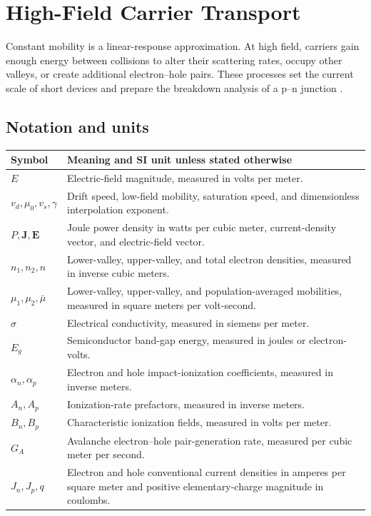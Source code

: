 \chapter{High-Field Carrier Transport}
\label{ch:high-field-transport}

Constant mobility is a linear-response approximation.  At high field, carriers
gain enough energy between collisions to alter their scattering rates, occupy
other valleys, or create additional electron--hole pairs.  These processes set
the current scale of short devices and prepare the breakdown analysis of a
p--n junction \cite[Chap.~2]{szeLee2012}.

\section{Notation and units}

\begin{center}
\small
\begin{tabularx}{\textwidth}{@{}lX@{}}
\toprule
Symbol & Meaning and SI unit unless stated otherwise \\
\midrule
$E$ & Electric-field magnitude, measured in volts per meter. \\
$v_d,\mu_0,v_s,\gamma$ & Drift speed, low-field mobility, saturation speed, and dimensionless interpolation exponent. \\
$P,\bm J,\bm E$ & Joule power density in watts per cubic meter, current-density vector, and electric-field vector. \\
$n_1,n_2,n$ & Lower-valley, upper-valley, and total electron densities, measured in inverse cubic meters. \\
$\mu_1,\mu_2,\bar\mu$ & Lower-valley, upper-valley, and population-averaged mobilities, measured in square meters per volt-second. \\
$\sigma$ & Electrical conductivity, measured in siemens per meter. \\
$E_g$ & Semiconductor band-gap energy, measured in joules or electron-volts. \\
$\alpha_n,\alpha_p$ & Electron and hole impact-ionization coefficients, measured in inverse meters. \\
$A_n,A_p$ & Ionization-rate prefactors, measured in inverse meters. \\
$B_n,B_p$ & Characteristic ionization fields, measured in volts per meter. \\
$G_A$ & Avalanche electron--hole pair-generation rate, measured per cubic meter per second. \\
$J_n,J_p,q$ & Electron and hole conventional current densities in amperes per square meter and positive elementary-charge magnitude in coulombs. \\
\bottomrule
\end{tabularx}
\end{center}

